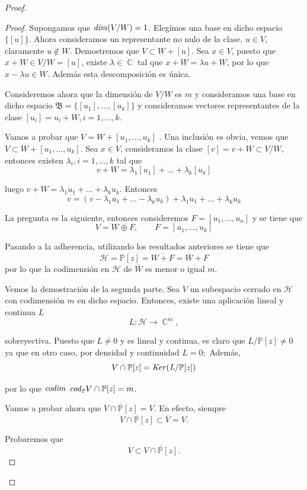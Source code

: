\documentclass[12pt]{amsart}
\theoremstyle{definition}
\theoremstyle{plain}
\theoremstyle{remark}
\DeclareMathOperator{\CC}{\mathbb C}
\begin{document}
\begin{proof}
\begin{proof}
\noindent Supongamos que ${\it dim}(V/W) = 1$. Elegímos una base en dicho espacio $\{[u]\}$. Ahora consideramos un representante no nulo de la clase, $u\in V$, claramente $u\notin W$. Demostremos que 
$V \subset  W + [u]$. 
Sea $x \in V$, puesto que  $x +W \in  V/W = [u]$, existe $\lambda \in \CC$ tal que  $x +W = \lambda u +W$, por lo que $x-\lambda u\in W$. Además esta descomposición es única.  
 

\noindent Consideremos ahora  que la dimensión de $V/W$ es $m$ y consideramos una base en dicho espacio $\mathfrak{B}=\{[u_1],\dots, [u_k]\}$ y consideramos vectores representantes de la clase $[u_i]=u_i+W, i=1,\dots,k$. 

\noindent Vamos a probar que $V=W+[u_1,\dots,u_k]$
. Una inclusión es obvia, vemos que $V\subset W+[u_1,\dots,u_k]$. Sea $x\in V$, consideramos la clase $[v]=v+W\subset V/W$, entonces existen $\lambda_i,i=1,\dots,k$ tal que 
$$
v+W=\lambda_1[u_1]+ \dots +\lambda_k[u_k]
$$

\noindent luego $v+W=\lambda_1u_1+\dots+\lambda_ku_k.$ Entonces 
$$
v=(v-\lambda_1u_1+\dots-\lambda_ku_k)+\lambda_1u_1+\dots+\lambda_ku_k
$$


La pregunta es la siguiente, entonces consideremos $F=[u_1,\dots,u_n]$ y se tiene que 
$$
V=W\oplus F, \qquad F=[u_1,\dots,u_k]
$$

\noindent 
\noindent Pasando a la adherencia, utilizando los resultados anteriores se tiene que
$$
\mathcal{H}=\overline{\mathbb{P}[z]}=\overline{W + F}=\overline{W} + F
$$
por lo que la codimensión en $\mathcal{H}$ de $\overline{W}$ es menor o igual $m$.



\noindent Vemos la demostración de  la segunda parte. Sea $V$ un subespacio cerrado en $\mathcal{H}$ con codimensión $m$ en dicho espacio. Entonces, existe una aplicación lineal y continua $L$
$$
L: \mathcal{H} \to \CC^m, 
$$

\noindent sobreyectiva. Puesto que $L\neq 0$ y es lineal y continua, es claro que $L/\mathbb{P}[z]\neq 0$ ya que en otro caso, por densidad y continuidad $L=0;$ Además, 
$$
V \cap \mathbb{P}[z]= {\it Ker (L/\mathbb{P}[z])}
$$

\noindent por lo que ${\it codim}$
${\it cod}_{\mathbb{P}} V \cap \mathbb{P}[z]=m$. 

\noindent Vamos a probar ahora que $\overline{V\cap \mathbb{P}[z]}=V$. En efecto, siempre 
$$
\overline{V\cap \mathbb{P}[z]} \subset \overline{V}=V. 
$$

\noindent Probaremos que 
$$
V \subset \overline{V\cap \mathbb{P}[z]}. 
$$


\end{proof}
\end{proof}
\end{document}
